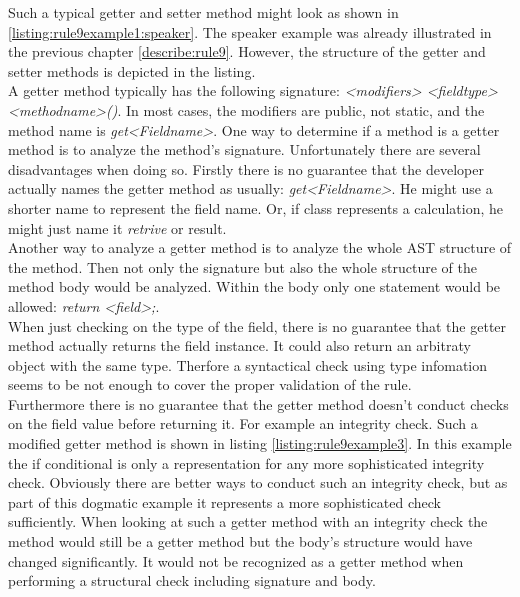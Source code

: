 Such a typical getter and setter method might look as shown in \ref{listing:rule9example1:speaker}. The speaker example was already illustrated in the previous chapter \ref{describe:rule9}. However, the structure of the getter and setter methods is depicted in the listing. 
\\

A getter method typically has the following signature: \textit{<modifiers> <fieldtype> <methodname>()}. In most cases, the modifiers are public, not static, and the method name is \textit{get<Fieldname>}. One way to determine if a method is a getter method is to analyze the method's signature. Unfortunately there are several disadvantages when doing so. Firstly there is no guarantee that the developer actually names the getter method as usually: \textit{get<Fieldname>}. He might use a shorter name to represent the field name. Or, if class represents a calculation, he might just name it \textit{retrive} or {result}. 
\\

Another way to analyze a getter method is to analyze the whole \acf{AST} structure of the method. Then not only the signature but also the whole structure of the method body would be analyzed. Within the body only one statement would be allowed: \textit{return <field>;}. 
\\

When just checking on the type of the field, there is no guarantee that the getter method actually returns the field instance. It could also return an arbitraty object with the same type. Therfore a syntactical check using type infomation seems to be not enough to cover the proper validation of the rule. 
\\

Furthermore there is no guarantee that the getter method doesn't conduct checks on the field value before returning it. For example an integrity check. Such a modified getter method is shown in listing \ref{listing:rule9example3}. In this example the if conditional is only a representation for any more sophisticated integrity check. Obviously there are better ways to conduct such an integrity check, but as part of this dogmatic example it represents a more sophisticated check sufficiently. When looking at such a getter method with an integrity check the method would still be a getter method but the body's structure would have changed significantly. It would not be recognized as a getter method when performing a structural check including signature and body.
\\

